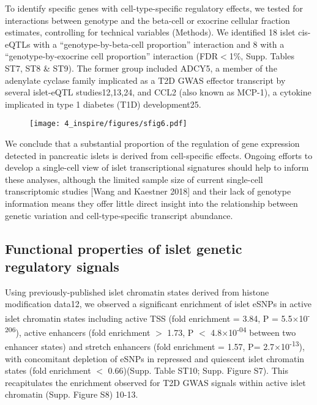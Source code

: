 To identify specific genes with cell-type-specific regulatory effects, we tested for interactions between genotype and the beta-cell or exocrine cellular fraction estimates, controlling for technical variables (Methods). We identified 18 islet cis-eQTLs with a “genotype-by-beta-cell proportion” interaction and 8 with a “genotype-by-exocrine cell proportion” interaction (FDR$<$1\%, Supp. Tables ST7, ST8 \& ST9). The former group included ADCY5, a member of the adenylate cyclase family implicated as a T2D GWAS effector transcript by several islet-eQTL studies12,13,24, and CCL2 (also known as MCP-1), a cytokine implicated in type 1 diabetes (T1D) development25. \\

\begin{figure}
    \centering
    \texttt{[image: 4\_inspire/figures/sfig6.pdf]}
    \caption{}
    \label{fig:c4_sf6}
\end{figure}

We conclude that a substantial proportion of the regulation of gene expression detected in pancreatic islets is derived from cell-specific effects. Ongoing efforts to develop a single-cell view of islet transcriptional signatures should help to inform these analyses, although the limited sample size of current single-cell transcriptomic studies [Wang and Kaestner 2018] and their lack of genotype information means they offer little direct insight into the relationship between genetic variation and cell-type-specific transcript abundance. 

\subsection{Functional properties of islet genetic regulatory signals} 	
Using previously-published islet chromatin states derived from histone modification data12, we observed a significant enrichment of islet eSNPs in active islet chromatin states including active TSS (fold enrichment = 3.84, P = 5.5$\times$10\textsuperscript{-206}), active enhancers (fold enrichment $>$ 1.73, P $<$ 4.8$\times$10\textsuperscript{-04} between two enhancer states) and stretch enhancers (fold enrichment = 1.57, P= 2.7$\times$10\textsuperscript{-13}), with concomitant depletion of eSNPs in repressed and quiescent islet chromatin states (fold enrichment $<$ 0.66)(Supp. Table ST10; Supp. Figure S7). This recapitulates the enrichment observed for T2D GWAS signals within active islet chromatin (Supp. Figure S8) 10-13.

